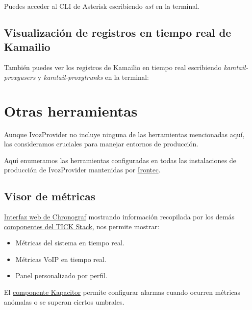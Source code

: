 \documentclass[letterpaper,10pt,spanish]{sphinxmanual}
\begin{document}
\noindent{}

Puedes acceder al CLI de Asterisk escribiendo \emph{ast} en la terminal.


\subsection{Visualización de registros en tiempo real de Kamailio}
\label{security_and_maintenance/maintenance/log_viewer:kamailio-realtime-log-viewing}
También puedes ver los registros de Kamailio en tiempo real escribiendo \emph{kamtail-proxyusers} y \emph{kamtail-proxytrunks} en la terminal:

\noindent{}


\section{Otras herramientas}
\label{security_and_maintenance/maintenance/other_tools::doc}\label{security_and_maintenance/maintenance/other_tools:other-tools}
Aunque IvozProvider no incluye ninguna de las herramientas mencionadas aquí, las consideramos cruciales para manejar entornos de producción.

Aquí enumeramos las herramientas configuradas en todas las instalaciones de producción de IvozProvider mantenidas por \href{https://www.irontec.com}{Irontec}.


\subsection{Visor de métricas}
\label{security_and_maintenance/maintenance/other_tools:metrics-viewer}
\href{https://www.influxdata.com/time-series-platform/chronograf/}{Interfaz web de Chronograf} mostrando información recopilada por los demás \href{https://www.influxdata.com/time-series-platform/}{componentes del TICK Stack}, nos permite mostrar:
\begin{itemize}
\item {} 
Métricas del sistema en tiempo real.

\item {} 
Métricas VoIP en tiempo real.

\item {} 
Panel personalizado por perfil.

\end{itemize}

El \href{https://www.influxdata.com/time-series-platform/kapacitor/}{componente Kapacitor} permite configurar alarmas cuando ocurren métricas anómalas o se superan ciertos umbrales.
\end{document}
